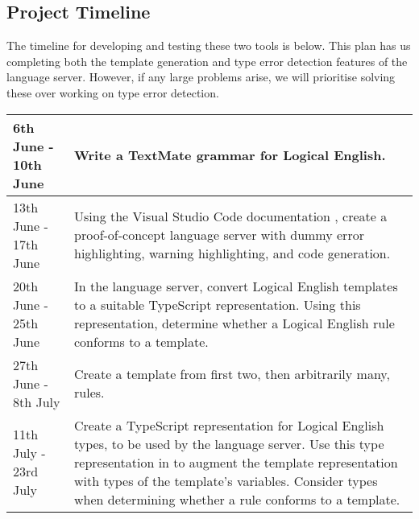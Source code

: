 \documentclass[../main.tex]{subfiles}
\begin{document}
\subsection*{Project Timeline}
The timeline for developing and testing these two tools is below. This plan has us completing both the template generation and type error detection features of the language server. However, if any large problems arise, we will prioritise solving these over working on type error detection.
\\
\begin{tabularx}{\textwidth}{|l|X|}
    \hline
    6th June - 10th June & 
    Write a TextMate grammar for Logical English.
    \\
    \hline
    13th June - 17th June & 
    Using the Visual Studio Code documentation \cite[]{vsc_langserver_features}, create a proof-of-concept language server with dummy error highlighting, warning highlighting, and code generation.
    \\ \hline
    20th June - 25th June & 
    In the language server, convert Logical English templates to a suitable TypeScript representation. \newline
    Using this representation, determine whether a Logical English rule conforms to a template.
    \\ \hline
    27th June - 8th July & 
    Create a template from first two, then arbitrarily many, rules.
    \\ \hline
    11th July - 23rd July & 
    Create a TypeScript representation for Logical English types, to be used by the language server. \newline
    Use this type representation in to augment the template representation with types of the template's variables. \newline
    Consider types when determining whether a rule conforms to a template.
    \\ \hline
\end{tabularx}
\end{document}

